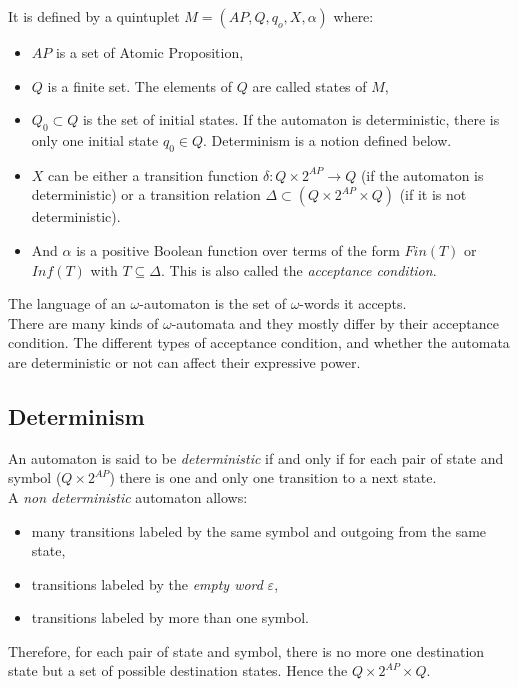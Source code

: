 It is defined by a quintuplet $M=(AP, Q, q_o, X, \alpha)$ where:
\begin{itemize}
 \item $AP$ is a set of Atomic Proposition,
 \item $Q$ is a finite set. The elements of $Q$ are called states of $M$,
 \item $Q_0 \subset Q$ is the set of initial states. If the automaton is deterministic, there is only one
       initial state $q_0 \in Q$. Determinism is a notion defined below.
 \item $X$ can be either a transition function $\delta : Q \times 2^{AP} \rightarrow Q$ (if the automaton is
       deterministic) or a transition relation $\Delta \subset (Q \times 2^{AP} \times Q)$ (if it is not
       deterministic).
 \item And $\alpha$ is a positive Boolean function over terms of the form $Fin(T)$ or $Inf(T)$ with
       $T \subseteq \Delta$. This is also called the \textit{acceptance condition}.
\end{itemize}

The language of an $\omega$-automaton is the set of $\omega$-words it accepts.\\

There are many kinds of $\omega$-automata and they mostly differ by their acceptance condition. The
different types of acceptance condition, and whether the automata are deterministic or not can affect their
expressive power.

\subsection{Determinism}
An automaton is said to be \textit{deterministic} if and only if for each pair of state and symbol ($Q \times 2^{AP}$)
there is one and only one transition to a next state.\\

\noindent A \textit{non deterministic} automaton allows:
\begin{itemize}
 \item many transitions labeled by the same symbol and outgoing from the same state,
 \item transitions labeled by the \textit{empty word} $\varepsilon$,
 \item transitions labeled by more than one symbol.
\end{itemize}

\noindent Therefore, for each pair of state and symbol, there is no more one destination state but a set of
possible destination states. Hence the $Q \times 2^{AP} \times Q$.

